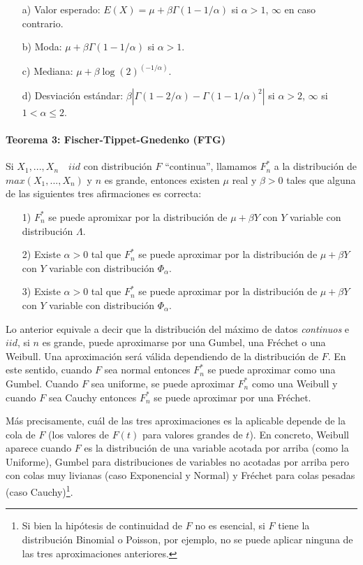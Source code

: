 \documentclass[
]{book}
\theoremstyle{definition}
\theoremstyle{definition}
\theoremstyle{definition}
\theoremstyle{definition}
\theoremstyle{remark}
\begin{document}
\begin{itemize}
  \item[a)] Valor esperado: $E(X) = \mu + \beta\Gamma(1-1/\alpha)$ si $\alpha > 1$, $\infty$ en caso contrario.
  \item[b)] Moda: $\mu + \beta\Gamma(1-1/\alpha)$ si $\alpha>1$.
  \item[c)] Mediana: $\mu + \beta \log(2)^{(-1/\alpha)}$.
  \item[d)] Desviación estándar: $\beta|\Gamma(1-2/\alpha)-\Gamma(1-1/\alpha)^2|$ si $\alpha>2$, $\infty$ si $1<\alpha \leq 2$.
\end{itemize}

\newpage

\paragraph{Teorema 3: Fischer-Tippet-Gnedenko (FTG)}\label{teorema-3-fischer-tippet-gnedenko-ftg}

Si \(X_1,...,X_n\quad iid\) con distribución \(F\) ``continua'', llamamos \(F_n^*\) a la distribución de \(max(X_1,...,X_n)\) y \(n\) es grande, entonces existen \(\mu\) real y \(\beta>0\) tales que alguna de las siguientes tres afirmaciones es correcta:

\begin{itemize}
  \item[1)] $F_n^*$ se puede apromixar por la distribución de $\mu+\beta Y$ con $Y$ variable con distribución $\Lambda$.
  \item[2)] Existe $\alpha>0$ tal que $F_n^*$ se puede aproximar por la distribución de $\mu+\beta Y$ con $Y$ variable con distribución $\Phi_{\alpha}$.
  \item[3)] Existe $\alpha>0$ tal que $F_n^*$ se puede aproximar por la distribución de $\mu+\beta Y$ con $Y$ variable con distribución $\Phi_{\alpha}$.
\end{itemize}

Lo anterior equivale a decir que la distribución del máximo de datos \textit{continuos} e \(iid\), si \(n\) es grande, puede aproximarse por una Gumbel, una Fréchet o una Weibull. Una aproximación será válida dependiendo de la distribución de \(F\). En este sentido, cuando \(F\) sea normal entonces \(F_n^*\) se puede aproximar como una Gumbel. Cuando \(F\) sea uniforme, se puede aproximar \(F_n^*\) como una Weibull y cuando \(F\) sea Cauchy entonces \(F_n^*\) se puede aproximar por una Fréchet.

Más precisamente, cuál de las tres aproximaciones es la aplicable depende de la cola de \(F\) (los valores de \(F(t)\) para valores grandes de \(t\)).
En concreto, Weibull aparece cuando \(F\) es la distribución de una variable acotada por arriba (como la Uniforme), Gumbel para distribuciones de variables no acotadas por arriba pero con colas muy livianas (caso Exponencial y Normal) y Fréchet para colas pesadas (caso Cauchy)\footnote{Si bien  la hipótesis de continuidad de $F$ no es esencial, si $F$ tiene
la distribución Binomial o Poisson, por ejemplo, no se puede aplicar ninguna de las tres aproximaciones anteriores.}.
\end{document}
